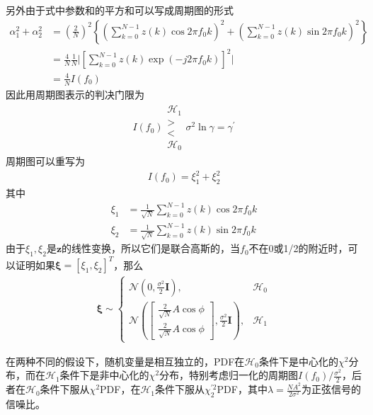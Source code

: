 \documentclass[fontset=windows]{article}
\numberwithin{figure}{section}
\begin{document}
另外由于式中参数和的平方和可以写成周期图的形式
\begin{align*}
    \alpha^2_1+\alpha^2_2
     & =(\frac{2}{N})^2\left\{(\sum_{k=0}^{N-1}z(k)\cos 2\pi f_0 k)^2 +(\sum_{k=0}^{N-1}z(k)\sin 2\pi f_0 k)^2\right\} \\
     & =\frac{4}{N}\frac{1}{N}\Bigg| \left[\sum_{k=0}^{N-1}z(k)\exp(-j2\pi f_0k)\right]^2\Bigg|                        \\
     & =\frac{4}{N}I(f_0)
\end{align*}
因此用周期图表示的判决门限为
\begin{align*}
    I(f_0)\begin{matrix}
              \mathcal{H}_1 \\>\\<\\\mathcal{H}_0
          \end{matrix}
    \sigma^2\ln \gamma=\gamma^{\prime}
\end{align*}
周期图可以重写为
\begin{align*}
    I(f_0)=\xi_1^2+\xi_2^2
\end{align*}
其中
\begin{align*}
    \xi_1 & =\frac{1}{\sqrt{N}}\sum_{k=0}^{N-1}z(k)\cos 2\pi f_0 k \\
    \xi_2 & =\frac{1}{\sqrt{N}}\sum_{k=0}^{N-1}z(k)\sin 2\pi f_0 k
\end{align*}
由于\(\xi_1,\xi_2\)是\(\mathbf{z}\)的线性变换，所以它们是联合高斯的，当\(f_0\)不在0或1/2的附近时，可以证明如果\(\boldsymbol{\xi}=[\xi_1,\xi_2]^T\)，那么
\begin{align*}
    \boldsymbol{\xi}\sim\left\{
    \begin{matrix}
        \mathcal{N}(0,\frac{\sigma^2}{2}\mathbf{I}),                                                                                                                               & \mathcal{H}_0 \\
        \mathcal{N}\left(\begin{bmatrix}\frac{2}{\sqrt{N}}A\cos \phi\\\frac{2}{\sqrt{N}}A\cos \phi\end{bmatrix},\frac{\sigma^2}{2}\mathbf{I}\right), & \mathcal{H}_1
    \end{matrix}
    \right.
\end{align*}

在两种不同的假设下，随机变量是相互独立的，PDF在\(\mathcal{H}_0\)条件下是中心化的\(\chi ^2\)分布，而在\(\mathcal{H}_1\)条件下是非中心化的\(\chi^2\)分布，特别考虑归一化的周期图\(I(f_0)/\frac{\sigma^2}{2}\)，后者在\(\mathcal{H}_0\)条件下服从\(\chi^2\)PDF，在\(\mathcal{H}_1\)条件下服从\(\chi^{\prime2}_2\)PDF，其中\(\lambda=\frac{NA^2}{2\sigma^2}\)为正弦信号的信噪比。
\end{document}
